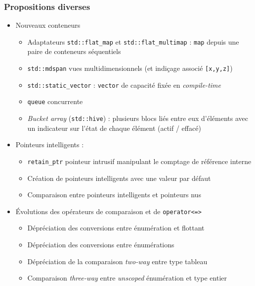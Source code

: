 \documentclass[C++.tex]{subfiles}
\begin{document}
\begin{frame}[fragile]
	\frametitle{Propositions diverses}
	\begin{itemize}
		\item Nouveaux conteneurs
		\begin{itemize}
			\item Adaptateurs \lstinline|std::flat_map| et \lstinline|std::flat_multimap| : \lstinline|map| depuis une paire de conteneurs séquentiels
			\item \lstinline|std::mdspan| vues multidimensionnels (et indiçage associé \lstinline|[x,y,z]|)


			\item \lstinline|std::static_vector| : \lstinline|vector| de capacité fixée en \textit{compile-time}


			\item \lstinline|queue| concurrente
			\item \textit{Bucket array} (\lstinline|std::hive|) : plusieurs blocs liés entre eux d'éléments  avec un indicateur sur l'état de chaque élément (actif / effacé)
		\end{itemize}

		\item Pointeurs intelligents :
		\begin{itemize}
			\item \lstinline|retain_ptr| pointeur intrusif manipulant le comptage de référence interne
			\item Création de pointeurs intelligents avec une valeur par défaut
			\item Comparaison entre pointeurs intelligents et pointeurs nus
		\end{itemize}
		\item Évolutions des opérateurs de comparaison et de \lstinline|operator<=>|
		\begin{itemize}
			\item Dépréciation des conversions entre énumération et flottant
			\item Dépréciation des conversions entre énumérations
			\item Dépréciation de la comparaison \og \textit{two-way}\fg{} entre type tableau
			\item Comparaison \textit{three-way} entre \textit{unscoped} énumération et type entier


		\end{itemize}
	\end{itemize}
\end{frame}
\end{document}
